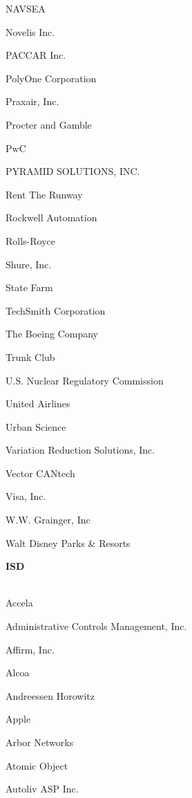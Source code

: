 \documentclass[twoside]{article}
\begin{document}
\begin{center}
\begin{multicols}{5}
\begin{FlushLeft}
\begin{compactitem}
\item NAVSEA
\item Novelis Inc.
\item PACCAR Inc.
\item PolyOne Corporation
\item Praxair, Inc.
\item Procter and Gamble
\item PwC
\item PYRAMID SOLUTIONS, INC.
\item Rent The Runway
\item Rockwell Automation
\item Rolls-Royce
\item Shure, Inc.
\item State Farm
\item TechSmith Corporation
\item The Boeing Company
\item Trunk Club
\item U.S. Nuclear Regulatory Commission
\item United Airlines
\item Urban Science
\item Variation Reduction Solutions, Inc.
\item Vector CANtech
\item Visa, Inc.
\item W.W. Grainger, Inc
\item Walt Disney Parks \& Resorts
\end{compactitem}
        \end{FlushLeft}
        \vspace{1em}
        {\fontsize{14}{16}\selectfont \bf ISD}\\
        \vspace{-1em}
        ~\hrulefill~
        \vspace{-.9em}
        \begin{FlushLeft}
        \begin{compactitem}
        \item Accela
\item Administrative Controls Management, Inc.
\item Affirm, Inc.
\item Alcoa
\item Andreessen Horowitz
\item Apple
\item Arbor Networks
\item Atomic Object
\item Autoliv ASP Inc.

\end{compactitem}
\end{FlushLeft}
\end{multicols}
\end{center}
\end{document}
